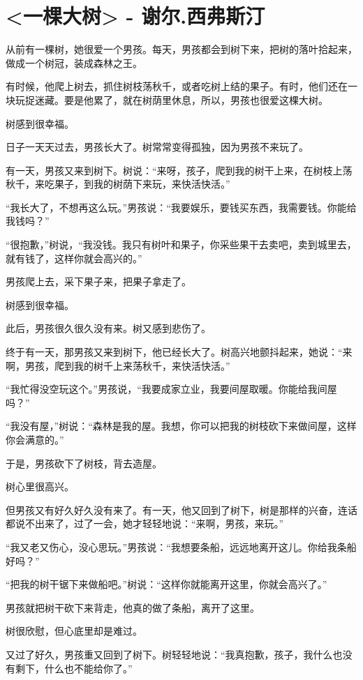 \documentclass[UTF8,a4paper,8pt]{ctexart}
\begin{document}
 \newpage
 \section{<一棵大树> - 谢尔.西弗斯汀}
 从前有一棵树，她很爱一个男孩。每天，男孩都会到树下来，把树的落叶拾起来，做成一个树冠，装成森林之王。 
 
 有时候，他爬上树去，抓住树枝荡秋千，或者吃树上结的果子。有时，他们还在一块玩捉迷藏。要是他累了，就在树荫里休息，所以，男孩也很爱这棵大树。 
 
 树感到很幸福。 
 
 日子一天天过去，男孩长大了。树常常变得孤独，因为男孩不来玩了。 
 
 有一天，男孩又来到树下。树说：“来呀，孩子，爬到我的树干上来，在树枝上荡秋千，来吃果子，到我的树荫下来玩，来快活快活。” 
 
 “我长大了，不想再这么玩。”男孩说：“我要娱乐，要钱买东西，我需要钱。你能给我钱吗？” 
 
 “很抱歉，”树说，“我没钱。我只有树叶和果子，你采些果干去卖吧，卖到城里去，就有钱了，这样你就会高兴的。” 
 
 男孩爬上去，采下果子来，把果子拿走了。 
 
 树感到很幸福。 
 
 此后，男孩很久很久没有来。树又感到悲伤了。 
 
 终于有一天，那男孩又来到树下，他已经长大了。树高兴地颤抖起来，她说：“来啊，男孩，爬到我的树千上来荡秋千，来快活快活。” 
 
 “我忙得没空玩这个。”男孩说，“我要成家立业，我要间屋取暖。你能给我间屋吗？” 
 
 “我没有屋，”树说：“森林是我的屋。我想，你可以把我的树枝砍下来做间屋，这样你会满意的。” 
 
 于是，男孩砍下了树枝，背去造屋。 
 
 树心里很高兴。 
 
 但男孩又有好久好久没有来了。有一天，他又回到了树下，树是那样的兴奋，连话都说不出来了，过了一会，她才轻轻地说：“来啊，男孩，来玩。” 
 
 “我又老又伤心，没心思玩。”男孩说：“我想要条船，远远地离开这儿。你给我条船好吗？” 
 
 “把我的树干锯下来做船吧。”树说：“这样你就能离开这里，你就会高兴了。” 
 
 男孩就把树干砍下来背走，他真的做了条船，离开了这里。 
 
 树很欣慰，但心底里却是难过。 
 
 又过了好久，男孩重又回到了树下。树轻轻地说：“我真抱歉，孩子，我什么也没有剩下，什么也不能给你了。” 
 
\end{document}

